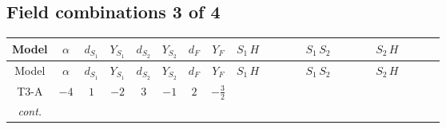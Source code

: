 \documentclass[8pt]{article}
\begin{document}
\begin{landscape}
\subsection*{Field combinations 3 of 4}
\begin{longtable}{@{}cccccccc >{\raggedright\arraybackslash}p{0.21\linewidth} >{\raggedright\arraybackslash}p{0.21\linewidth} >{\raggedright\arraybackslash}p{0.21\linewidth}@{}}
\toprule
Model & $\alpha$ & $d_{S_1}$ & $Y_{S_1}$ & $d_{S_2}$ & $Y_{S_2}$ & $d_F$ & $Y_F$ & $S_1\,H$ & $S_1\,S_2$ & $S_2\,H$ \\
\midrule
\endfirsthead
\toprule
Model & $\alpha$ & $d_{S_1}$ & $Y_{S_1}$ & $d_{S_2}$ & $Y_{S_2}$ & $d_F$ & $Y_F$ & $S_1\,H$ & $S_1\,S_2$ & $S_2\,H$ \\
\midrule
\endhead
T3-A & $-4$ & $1$ & $-2$ & $3$ & $-1$ & $2$ & $-\frac{3}{2}$ & \scriptsize\adjustbox{max width=\linewidth}{$\begin{gathered} +H_{a_2} S_1 H_{a_1}{}^{\dagger } S_1{}^{\dagger } \mathcal{I}_{H1,a_1,a_2}{}^1 \lambda_{HS_1}^{(1)}\end{gathered}$} & \scriptsize\adjustbox{max width=\linewidth}{$\begin{gathered} +S_1 S_{2,j_2} S_1{}^{\dagger } S_{2,j_1}{}^{\dagger } \mathcal{I}_{12,j_1,j_2}{}^1 \lambda_{12}^{(1)}\end{gathered}$} & \scriptsize\adjustbox{max width=\linewidth}{$\begin{gathered} +\frac{1}{2} H_{a_2} S_{2,j_2} H_{a_1}{}^{\dagger } S_{2,j_1}{}^{\dagger } \mathcal{I}_{H2,a_1,a_2,j_1,j_2}{}^1 \lambda_{HS_2}^{(1)} \\ +\frac{1}{2} H_{a_2} S_{2,j_2} H_{a_1}{}^{\dagger } S_{2,j_1}{}^{\dagger } \mathcal{I}_{H2,a_1,a_2,j_2,j_1}{}^1 \lambda_{HS_2}^{(1)} \\ +\frac{1}{2} H_{a_2} S_{2,j_2} H_{a_1}{}^{\dagger } S_{2,j_1}{}^{\dagger } \mathcal{I}_{H2,a_1,a_2,j_1,j_2}{}^2 \lambda_{HS_2}^{(2)}\end{gathered}$} \\
\textit{cont.} &  &  &  &  &  &  &  &  &  & \scriptsize\adjustbox{max width=\linewidth}{$\begin{gathered} +\frac{1}{2} H_{a_2} S_{2,j_2} H_{a_1}{}^{\dagger } S_{2,j_1}{}^{\dagger } \mathcal{I}_{H2,a_1,a_2,j_2,j_1}{}^2 \lambda_{HS_2}^{(2)}\end{gathered}$} \\
\midrule

\end{longtable}
\end{landscape}
\end{document}
